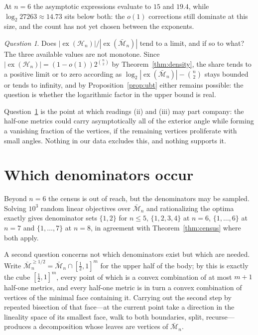 \documentclass[11pt]{article}
\theoremstyle{definition}
\theoremstyle{remark}
\newtheorem{question}[theorem]{Question}
\newcommand{\bM}{\bar{\mathcal{M}}}
\newcommand{\Ha}{\mathcal{H}}
\newcommand{\ex}{\operatorname{ex}}
\begin{document}
At $n=6$ the asymptotic expressions evaluate to $15$ and $19.4$, while
$\log_2 27263\approx14.73$ sits below both: the $o(1)$ corrections still dominate at this
size, and the count has not yet chosen between the exponents.

\begin{question}\label{q:share}
Does $|\ex(\Ha_n)|/|\ex(\bM_n)|$ tend to a limit, and if so to what? The three available
values are not monotone. Since $|\ex(\Ha_n)|=(1-o(1))2^{\binom n2}$ by
Theorem~\ref{thm:density}, the share tends to a positive limit or to zero according as
$\log_2|\ex(\bM_n)|-\binom n2$ stays bounded or tends to infinity, and by
Proposition~\ref{prop:ubt} either remains possible: the question is whether the logarithmic
factor in the upper bound is real.
\end{question}

Question~\ref{q:share} is the point at which readings (ii) and (iii) may part company: the
half-one metrics could carry asymptotically all of the exterior angle while forming a
vanishing fraction of the vertices, if the remaining vertices proliferate with small angles.
Nothing in our data excludes this, and nothing supports it.

\section{Which denominators occur}
\label{sec:denominators}

Beyond $n=6$ the census is out of reach, but the denominators may be sampled. Solving
$10^3$ random linear objectives over $\bM_n$ and rationalizing the optima exactly gives
denominator sets $\{1,2\}$ for $n\leq5$, $\{1,2,3,4\}$ at $n=6$, $\{1,\ldots,6\}$ at $n=7$
and $\{1,\ldots,7\}$ at $n=8$, in agreement with Theorem~\ref{thm:census} where both apply.

A second question concerns not which denominators exist but which are needed. Write
$\bM_n^{\geq1/2}=\bM_n\cap[\tfrac12,1]^m$ for the upper half of the body; by
\cite{FK-cone} this is exactly the cube $[\tfrac12,1]^m$, every point of which is a convex
combination of at most $m+1$ half-one metrics, and every half-one metric is in turn a convex
combination of vertices of the minimal face containing it. Carrying out the second step by
repeated bisection of that face---at the current point take a direction in the lineality
space of its smallest face, walk to both boundaries, split, recurse---produces a
decomposition whose leaves are vertices of $\bM_n$.
\end{document}
